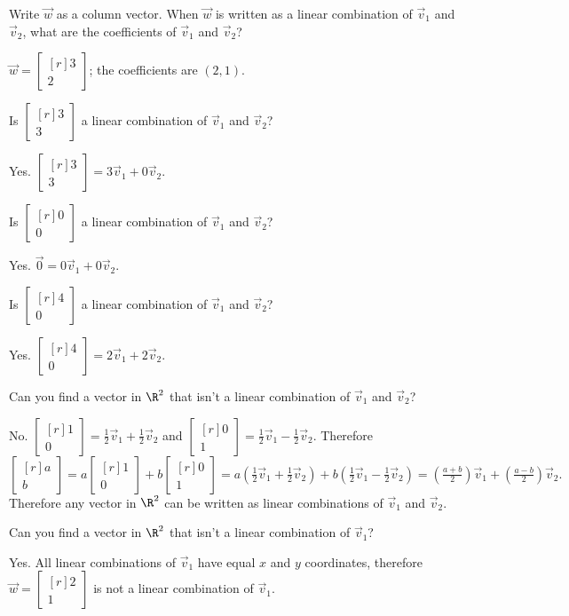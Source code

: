 \documentclass{problemset}
\newcommand{\mat}[1]{\begin{bmatrix*}[r]#1\end{bmatrix*}}
\begin{document}
	\begin{parts}
		\item Write $\vec w$ as a column vector. When $\vec w$ is written as a
			linear combination of $\vec v_1$ and $\vec v_2$, what are the
			coefficients of $\vec v_1$ and $\vec v_2$?
			\begin{solution}
				$\vec w=\mat{3\\2}$; the coefficients are $(2,1)$.
			\end{solution}
		\item Is $\mat{3\\3}$ a linear combination of $\vec v_1$ and $\vec v_2$?
			\begin{solution}[inline]
				Yes. $\mat{3\\3}=3\vec v_1+0\vec v_2$.
			\end{solution}

		\item Is $\mat{0\\0}$ a linear combination of $\vec v_1$ and $\vec v_2$?
			\begin{solution}[inline]
				Yes. $\vec 0=0\vec v_1+0\vec v_2$.
			\end{solution}
		\item Is $\mat{4\\0}$ a linear combination of $\vec v_1$ and $\vec v_2$?
			\begin{solution}[inline]
				Yes. $\mat{4\\0}=2\vec v_1+2\vec v_2$.
			\end{solution}
		\item Can you find a vector in $\R^2$ that isn't a linear combination of
		$\vec v_1$ and $\vec v_2$?
			\begin{solution}
				No. $\mat{1\\0}=\tfrac{1}{2}\vec v_1+\tfrac{1}{2}\vec v_2$ and
				$\mat{0\\1}=\tfrac{1}{2}\vec v_1-\tfrac{1}{2}\vec v_2$.
				Therefore
				\[
					\mat{a\\b}
					= a\mat{1\\0}+b\mat{0\\1}
					= a(\tfrac{1}{2}\vec v_1+\tfrac{1}{2}\vec v_2)
						+b(\tfrac{1}{2}\vec v_1-\tfrac{1}{2}\vec v_2)
					=(\tfrac{a+b}{2})\vec v_1+(\tfrac{a-b}{2})\vec v_2.
				\]
				Therefore any vector in $\R^2$ can be written as linear combinations
				of $\vec v_1$ and $\vec v_2$.
			\end{solution}
		\item Can you find a vector in $\R^2$ that isn't a linear combination of
			$\vec v_1$?
			\begin{solution}
				Yes. All linear combinations of $\vec v_1$ have equal $x$ and
				$y$ coordinates, therefore $\vec w=\mat{2\\1}$ is not a linear
				combination of $\vec v_1$.
			\end{solution}
	\end{parts}
\end{document}
